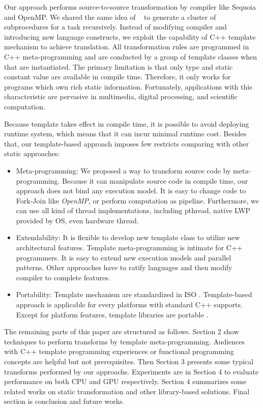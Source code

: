 \documentclass[10pt, conference, compsocconf]{IEEEtran}
\begin{document}
Our approach performs source-to-source transformation by compiler like Sequoia and OpenMP. We shared the same idea of  ~\cite{b1} to generate a cluster of subprocedures for a task recursively. Instead of modifying compiler and introducing new language constructs, we exploit the capability of C++ template mechanism to achieve translation. All transformation rules are programmed in C++ meta-programming \cite{b10} and are conducted by a group of template classes when that are instantiated. The primary limitation is that only type and static constant value are available in compile time. Therefore, it only works for programs which own rich static information. Fortunately, applications with this characteristic are pervasive in multimedia, digital processing, and scientific computation.

Because template takes effect in compile time, it is possible to avoid deploying runtime system, which means that it can incur minimal runtime cost. Besides that, our template-based approach imposes few restricts comparing with other static approaches:

\begin{itemize}
\item Meta-programming: We proposed a way to transform source code by
meta-programming. Because it can manipulate source code in compile
time,  our approach does not bind any execution model. It is easy to
change code to Fork-Join like \emph{OpenMP}, or perform computation
as pipeline. Furthermore, we can use all kind of thread
implementations, including pthread, native LWP provided by OS, even hardware thread.

\item Extendability:  It is flexible to develop new template class to utilize new architectural features. Template meta-programming is intimate for C++ programmers. It is easy to extend new execution models and parallel patterns. Other approaches have to ratify languages and then modify compiler to complete features.

\item Portability: Template mechanism are standardized in ISO
  \cite{b8, b17}. Template-based approach is applicable for every
  platforms with standard C++ supports. Except for platform features,
  template libraries are portable .
\end{itemize}

The remaining parts of this paper are structured as follows.
 Section 2 show techniques to perform
transforms by template meta-programming. Audiences with C++ template
programming experiences or functional programming concepts are helpful
but not prerequisites. Then Section 3 presents some typical transforms
performed by our approachs. Experiments are in Section 4 to evaluate
performance on both CPU and GPU respectively.
 Section 4 summarizes some related works on static transformation and other
library-based solutions.  Final section is conclusion and future works.
\end{document}
